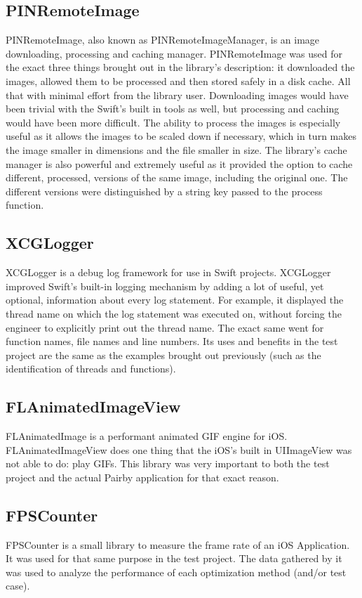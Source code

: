 \documentclass[a4paper,12pt]{article}
\begin{document}
\subsection{PINRemoteImage}
PINRemoteImage, also known as PINRemoteImageManager, is an image downloading, processing and caching manager.\cite{PINRemoteImage} PINRemoteImage was used for the exact three things brought out in the library's description: it downloaded the images, allowed them to be processed and then stored safely in a disk cache. All that with minimal effort from the library user. Downloading images would have been trivial with the Swift's built in tools as well, but processing and caching would have been more difficult. The ability to process the images is especially useful as it allows the images to be scaled down if necessary, which in turn makes the image smaller in dimensions and the file smaller in size. The library's cache manager is also powerful and extremely useful as it provided the option to cache different, processed, versions of the same image, including the original one. The different versions were distinguished by a string key passed to the process function.

\subsection{XCGLogger}
XCGLogger is a debug log framework for use in Swift projects.\cite{XCGLogger} XCGLogger improved Swift's built-in logging mechanism by adding a lot of useful, yet optional, information about every log statement. For example, it displayed the thread name on which the log statement was executed on, without forcing the engineer to explicitly print out the thread name. The exact same went for function names, file names and line numbers. Its uses and benefits in the test project are the same as the examples brought out previously (such as the identification of threads and functions).

\subsection{FLAnimatedImageView}
FLAnimatedImage is a performant animated GIF engine for iOS.\cite{FLAnimatedImageView} FLAnimatedImageView does one thing that the iOS's built in UIImageView was not able to do: play GIFs. This library was very important to both the test project and the actual Pairby application for that exact reason.

\subsection{FPSCounter}
FPSCounter is a small library to measure the frame rate of an iOS Application.\cite{FPSCounterGithub} It was used for that same purpose in the test project. The data gathered by it was used to analyze the performance of each optimization method (and/or test case).
\end{document}

